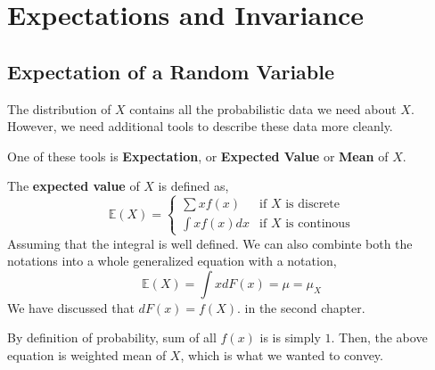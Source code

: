 \chapter{Expectations and Invariance}
\section{Expectation of a Random Variable}
The distribution of $X$ contains all the probabilistic data we need about $X$. However, we need additional tools to describe these data more cleanly. 
\par
One of these tools is \textbf{Expectation}, or \textbf{Expected Value} or \textbf{Mean} of $X$.
\begin{definition}
    The \textbf{expected value} of $X$ is defined as,
    \[\mathbb{E}(X)= \begin{cases}
        \sum xf(x)& \text{if $X$ is discrete} \\
        \int xf(x)dx &\text{if $X$ is continous}
    \end{cases}\]
    Assuming that the integral is well defined.
    We can also combinte both the notations into a whole generalized equation with a notation,
    \[\mathbb{E}(X) = \int x dF(x)= \mu = \mu_X\]
    We have discussed that $dF(x) = f(X)$. in the second chapter.
\end{definition}
By definition of probability, sum of all $f(x)$ is is simply $1$. Then, the above equation is weighted mean of $X$, which is what we wanted to convey.

